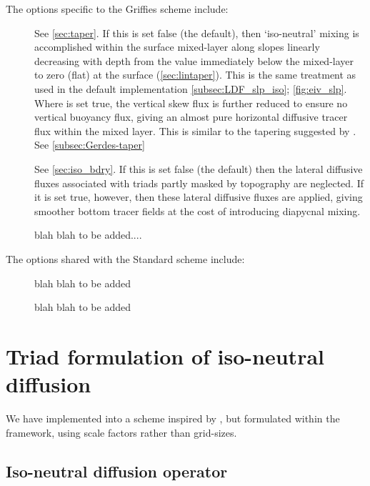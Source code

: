 \documentclass[../main/NEMO_manual]{subfiles}
\begin{document}
The options specific to the Griffies scheme include:
\begin{description}
\item[]
  See \autoref{sec:taper}.
  If this is set false (the default),
  then `iso-neutral' mixing is accomplished within the surface mixed-layer along slopes linearly decreasing with
  depth from the value immediately below the mixed-layer to zero (flat) at the surface (\autoref{sec:lintaper}).
  This is the same treatment as used in the default implementation
  \autoref{subsec:LDF_slp_iso}; \autoref{fig:eiv_slp}.
  Where  is set true,
  the vertical skew flux is further reduced to ensure no vertical buoyancy flux,
  giving an almost pure horizontal diffusive tracer flux within the mixed layer.
  This is similar to the tapering suggested by \citet{Gerdes1991}. See \autoref{subsec:Gerdes-taper}
\item[]
  See \autoref{sec:iso_bdry}. 
  If this is set false (the default) then the lateral diffusive fluxes
  associated with triads partly masked by topography are neglected. 
  If it is set true, however, then these lateral diffusive fluxes are applied, 
  giving smoother bottom tracer fields at the cost of introducing diapycnal mixing.
\item[]
  blah blah to be added....
\end{description}
The options shared with the Standard scheme include:
\begin{description}
\item[]   blah blah to be added
\item[]  blah blah to be added
\end{description}

\section{Triad formulation of iso-neutral diffusion}
\label{sec:iso}

We have implemented into \NEMO a scheme inspired by \citet{Griffies_al_JPO98},
but formulated within the \NEMO framework, using scale factors rather than grid-sizes.

\subsection{Iso-neutral diffusion operator}
\end{document}
